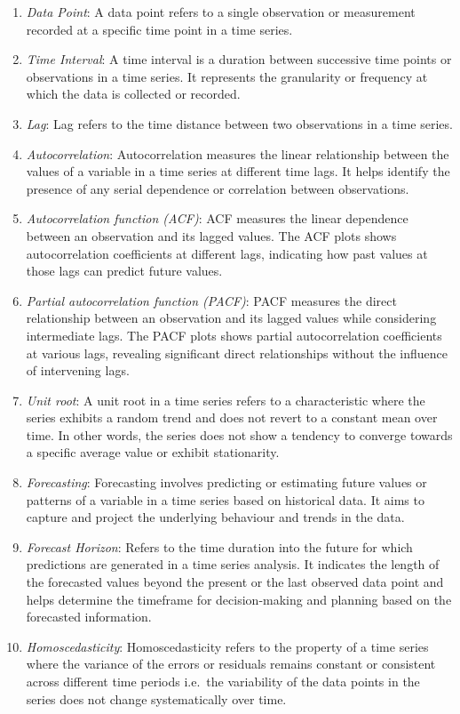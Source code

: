 \documentclass[
]{article}
\providecommand{\tightlist}{%
  \setlength{\itemsep}{0pt}\setlength{\parskip}{0pt}}
\begin{document}
\begin{enumerate}
\def\labelenumi{\arabic{enumi}.}
\tightlist
\item
  \emph{Data Point}: A data point refers to a single observation or
  measurement recorded at a specific time point in a time series.
\item
  \emph{Time Interval}: A time interval is a duration between successive
  time points or observations in a time series. It represents the
  granularity or frequency at which the data is collected or recorded.
\item
  \emph{Lag}: Lag refers to the time distance between two observations
  in a time series.
\item
  \emph{Autocorrelation}: Autocorrelation measures the linear
  relationship between the values of a variable in a time series at
  different time lags. It helps identify the presence of any serial
  dependence or correlation between observations.
\item
  \emph{Autocorrelation function (ACF)}: ACF measures the linear
  dependence between an observation and its lagged values. The ACF plots
  shows autocorrelation coefficients at different lags, indicating how
  past values at those lags can predict future values.
\item
  \emph{Partial autocorrelation function (PACF)}: PACF measures the
  direct relationship between an observation and its lagged values while
  considering intermediate lags. The PACF plots shows partial
  autocorrelation coefficients at various lags, revealing significant
  direct relationships without the influence of intervening lags.
\item
  \emph{Unit root}: A unit root in a time series refers to a
  characteristic where the series exhibits a random trend and does not
  revert to a constant mean over time. In other words, the series does
  not show a tendency to converge towards a specific average value or
  exhibit stationarity.
\item
  \emph{Forecasting}: Forecasting involves predicting or estimating
  future values or patterns of a variable in a time series based on
  historical data. It aims to capture and project the underlying
  behaviour and trends in the data.
\item
  \emph{Forecast Horizon}: Refers to the time duration into the future
  for which predictions are generated in a time series analysis. It
  indicates the length of the forecasted values beyond the present or
  the last observed data point and helps determine the timeframe for
  decision-making and planning based on the forecasted information.
\item
  \emph{Homoscedasticity}: Homoscedasticity refers to the property of a
  time series where the variance of the errors or residuals remains
  constant or consistent across different time periods i.e.~the
  variability of the data points in the series does not change
  systematically over time.
\end{enumerate}
\end{document}
